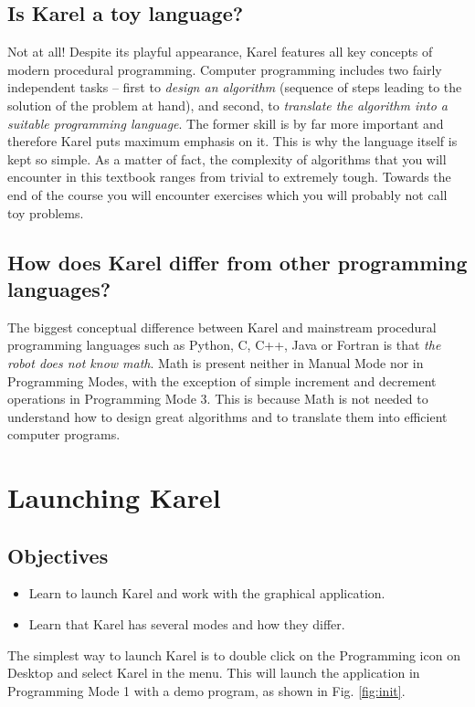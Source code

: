 \subsection{Is Karel a toy language?}

Not at all! Despite its playful appearance, Karel features all key
concepts of modern procedural programming. Computer programming includes two 
fairly independent tasks -- first to {\em design an algorithm} (sequence of 
steps leading to the solution of the problem at hand), and second, to {\em translate 
the algorithm into a suitable programming language}. The former skill is by 
far more important and therefore Karel puts maximum emphasis on it. This is 
why the language itself is kept so simple. As a matter of fact, the complexity 
of algorithms that you will encounter in this textbook ranges from trivial  
to extremely tough. Towards the end of the course you will encounter exercises
which you will probably not call toy problems.

\subsection{How does Karel differ from other programming languages?}

The biggest conceptual difference between Karel and mainstream procedural
programming languages such as Python, C, C++, Java or Fortran is that {\em 
the robot does not know math}. Math is present neither in Manual Mode nor 
in Programming Modes, with the exception of simple increment and decrement 
operations in Programming Mode 3. This is because Math is not needed to 
understand how to design great algorithms and to translate them into 
efficient computer programs. 
 
\section{Launching Karel}

\subsection{Objectives} 
\begin{itemize}
\item Learn to launch Karel and work with the graphical application.
\item Learn that Karel has several modes and how they differ.
\end{itemize}
\noindent
The simplest way to launch Karel is to double click on the Programming icon on Desktop 
and select Karel in the menu. This will launch the application in Programming 
Mode 1 with a demo program, as shown in Fig. 
\ref{fig:init}.

